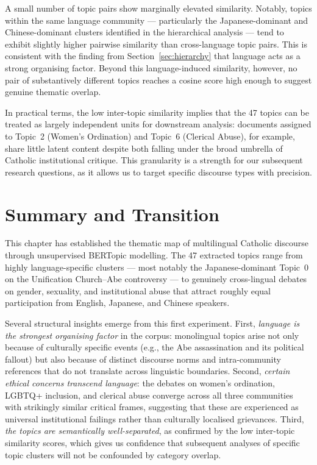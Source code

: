 \documentclass[../CLthesis.tex]{subfiles}
\begin{document}
A small number of topic pairs show marginally elevated similarity. Notably, topics within the same language community --- particularly the Japanese-dominant and Chinese-dominant clusters identified in the hierarchical analysis --- tend to exhibit slightly higher pairwise similarity than cross-language topic pairs. This is consistent with the finding from Section~\ref{sec:hierarchy} that language acts as a strong organising factor. Beyond this language-induced similarity, however, no pair of substantively different topics reaches a cosine score high enough to suggest genuine thematic overlap.

In practical terms, the low inter-topic similarity implies that the 47 topics can be treated as largely independent units for downstream analysis: documents assigned to Topic~2 (Women's Ordination) and Topic~6 (Clerical Abuse), for example, share little latent content despite both falling under the broad umbrella of Catholic institutional critique. This granularity is a strength for our subsequent research questions, as it allows us to target specific discourse types with precision.

\section{Summary and Transition}
\label{sec:bertopic-summary}

This chapter has established the thematic map of multilingual Catholic discourse through unsupervised BERTopic modelling. The 47 extracted topics range from highly language-specific clusters --- most notably the Japanese-dominant Topic~0 on the Unification Church–Abe controversy --- to genuinely cross-lingual debates on gender, sexuality, and institutional abuse that attract roughly equal participation from English, Japanese, and Chinese speakers.

Several structural insights emerge from this first experiment. First, \textit{language is the strongest organising factor} in the corpus: monolingual topics arise not only because of culturally specific events (e.g., the Abe assassination and its political fallout) but also because of distinct discourse norms and intra-community references that do not translate across linguistic boundaries. Second, \textit{certain ethical concerns transcend language}: the debates on women's ordination, LGBTQ+ inclusion, and clerical abuse converge across all three communities with strikingly similar critical frames, suggesting that these are experienced as universal institutional failings rather than culturally localised grievances. Third, \textit{the topics are semantically well-separated}, as confirmed by the low inter-topic similarity scores, which gives us confidence that subsequent analyses of specific topic clusters will not be confounded by category overlap.
\end{document}
